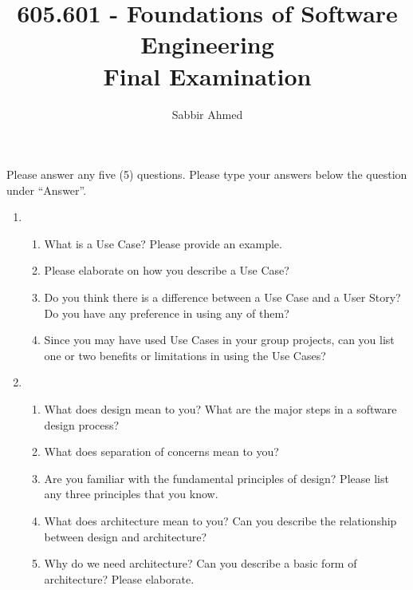 \documentclass[12pt]{article}
\begin{document}
  \title{605.601 - Foundations of Software Engineering \\ Final Examination\vspace{-0.5em}}
  \author{Sabbir Ahmed}
  \maketitle
  \vspace{-5em}

  \section*{} Please answer any five (5) questions. Please type your answers below the question under ``Answer''.

  \begin{enumerate}

    \item
    \begin{enumerate}[start=1,align=left]
      \item What is a Use Case? Please provide an example.
      \item Please elaborate on how you describe a Use Case?
      \item Do you think there is a difference between a Use Case and a User Story? Do you have any preference in using any of them?
      \item Since you may have used Use Cases in your group projects, can you list one or two benefits or limitations in using the Use Cases?
    \end{enumerate}

    \item
    \begin{enumerate}[start=1,align=left]
      \item What does design mean to you? What are the major steps in a software design process?
      \item What does separation of concerns mean to you?
      \item Are you familiar with the fundamental principles of design? Please list any three principles that you know.
      \item What does architecture mean to you? Can you describe the relationship between design and architecture?
      \item Why do we need architecture? Can you describe a basic form of architecture? Please elaborate.
    \end{enumerate}


\end{enumerate}
\end{document}

